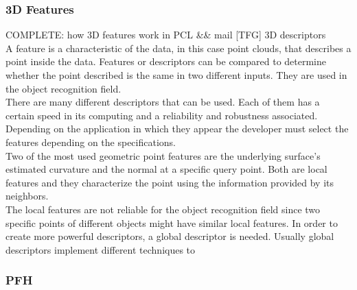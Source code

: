 \subsubsection{3D Features}
\label{3d_features}
COMPLETE: how 3D features work in PCL  &&  mail [TFG] 3D descriptors
\\

A feature is a characteristic of the data, in this case point clouds, that describes a point inside the data. Features or descriptors can be compared to determine whether the point described is the same in two different inputs. They are used in the object recognition field. 
\\

There are many different descriptors that can be used. Each of them has a certain speed in its computing and a reliability and robustness associated. Depending on the application in which they appear the developer must select the features depending on the specifications. 
\\

Two of the most used geometric point features are the underlying surface's estimated curvature and the normal at a specific query point. Both are local features and they characterize the point using the information provided by its neighbors. \\

The local features are not reliable for the object recognition field since two specific points of different objects might have similar local features. In order to create more powerful descriptors, a global descriptor is needed. Usually global descriptors implement different techniques to 


\subsubsection{PFH}
\label{pfh}
